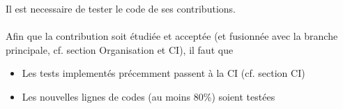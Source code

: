 Il est necessaire de tester le code de ses contributions.
\\\\
Afin que la contribution soit étudiée et acceptée (et fusionnée avec la branche principale, cf. section Organisation et CI), il faut que
\begin{itemize}
	\item Les tests implementés précemment passent à la CI (cf. section CI)
	\item Les nouvelles lignes de codes (au moins 80\%) soient testées
\end{itemize}
